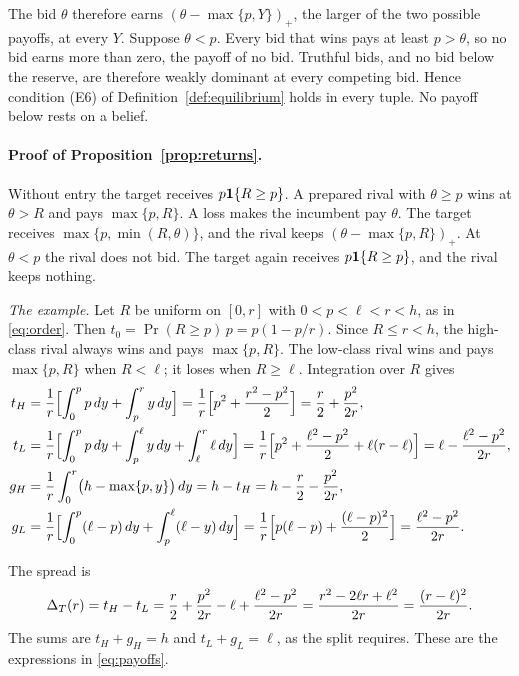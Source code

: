 The bid \(\theta\) therefore earns \((\theta-\max\{p,Y\})_+\), the larger of the two possible payoffs, at every \(Y\).
Suppose \(\theta<p\). Every bid that wins pays at least \(p>\theta\), so no bid earns more than zero, the payoff of no
bid. Truthful bids, and no bid below the reserve, are therefore weakly dominant at every competing bid. Hence
condition (E6) of Definition~\ref{def:equilibrium} holds in every tuple. No payoff below rests on a belief.

\paragraph{Proof of Proposition~\ref{prop:returns}.}
Without entry the target receives \(p\mathbf{1}\{R\ge p\}\). A prepared rival with \(\theta\ge p\) wins at
\(\theta>R\) and pays \(\max\{p,R\}\). A loss makes the incumbent pay \(\theta\). The target receives
\(\max\{p,\min(R,\theta)\}\), and the rival keeps \((\theta-\max\{p,R\})_+\). At \(\theta<p\) the
rival does not bid. The target again receives \(p\mathbf{1}\{R\ge p\}\), and the rival keeps nothing.

\emph{The example.} Let \(R\) be uniform on \([0,r]\) with \(0<p<\ell<r<h\), as in \eqref{eq:order}. Then
\(t_0=\Pr(R\ge p)\,p=p(1-p/r)\). Since \(R\le r<h\), the high-class rival always wins and pays
\(\max\{p,R\}\). The low-class rival wins and pays \(\max\{p,R\}\) when \(R<\ell\); it loses when
\(R\ge\ell\). Integration over \(R\) gives
\begin{equation}\label{eq:a-payoffs}
\begin{aligned}
t_H&=\frac1r\Bigl[\int_0^p p\,dy+\int_p^r y\,dy\Bigr]
=\frac1r\Bigl[p^2+\frac{r^2-p^2}2\Bigr]=\frac r2+\frac{p^2}{2r},\\
t_L&=\frac1r\Bigl[\int_0^p p\,dy+\int_p^\ell y\,dy+\int_\ell^r\ell\,dy\Bigr]
=\frac1r\Bigl[p^2+\frac{\ell^2-p^2}2+\ell(r-\ell)\Bigr]=\ell-\frac{\ell^2-p^2}{2r},\\
g_H&=\frac1r\int_0^r\bigl(h-\max\{p,y\}\bigr)\,dy=h-t_H=h-\frac r2-\frac{p^2}{2r},\\
g_L&=\frac1r\Bigl[\int_0^p(\ell-p)\,dy+\int_p^\ell(\ell-y)\,dy\Bigr]
=\frac1r\Bigl[p(\ell-p)+\frac{(\ell-p)^2}2\Bigr]=\frac{\ell^2-p^2}{2r}.
\end{aligned}
\end{equation}

The spread is
\[
\Delta_T(r)=t_H-t_L=\frac r2+\frac{p^2}{2r}-\ell+\frac{\ell^2-p^2}{2r}=\frac{r^2-2\ell r+\ell^2}{2r}
=\frac{(r-\ell)^2}{2r}.
\]
The sums are \(t_H+g_H=h\) and \(t_L+g_L=\ell\), as the split requires. These are the expressions in \eqref{eq:payoffs}.

